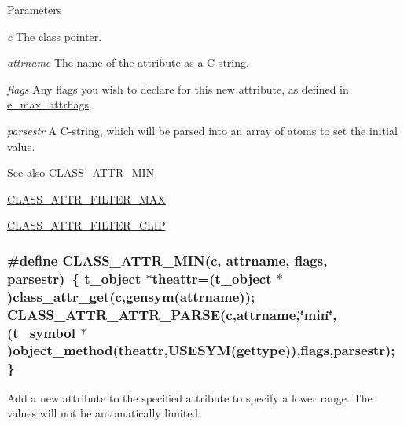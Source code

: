 \begin{DoxyParams}{Parameters}
\item[{\em c}]The class pointer. \item[{\em attrname}]The name of the attribute as a C-\/string. \item[{\em flags}]Any flags you wish to declare for this new attribute, as defined in \hyperlink{group__attr_gaf296cfc6741bb19207f6ed8062809115}{e\_\-max\_\-attrflags}. \item[{\em parsestr}]A C-\/string, which will be parsed into an array of atoms to set the initial value. \end{DoxyParams}
\begin{DoxySeeAlso}{See also}
\hyperlink{group__attr_gaa4c359315d2cefa59ed8b1200411d85a}{CLASS\_\-ATTR\_\-MIN} 

\hyperlink{group__attr_ga6d756455a9923aa01a16796b7d458fd9}{CLASS\_\-ATTR\_\-FILTER\_\-MAX} 

\hyperlink{group__attr_ga7a9fa82b3419df8a770830fb34df39b0}{CLASS\_\-ATTR\_\-FILTER\_\-CLIP} 
\end{DoxySeeAlso}
\hypertarget{group__attr_gaa4c359315d2cefa59ed8b1200411d85a}{
\subsubsection[{CLASS\_\-ATTR\_\-MIN}]{\setlength{\rightskip}{0pt plus 5cm}\#define CLASS\_\-ATTR\_\-MIN(c, \/  attrname, \/  flags, \/  parsestr)~\{ {\bf t\_\-object} $\ast$theattr=({\bf t\_\-object} $\ast$)class\_\-attr\_\-get(c,gensym(attrname)); CLASS\_\-ATTR\_\-ATTR\_\-PARSE(c,attrname,\char`\"{}min\char`\"{},(t\_\-symbol $\ast$)object\_\-method(theattr,USESYM(gettype)),flags,parsestr); \}}}
\label{group__attr_gaa4c359315d2cefa59ed8b1200411d85a}


Add a new attribute to the specified attribute to specify a lower range. The values will not be automatically limited.


